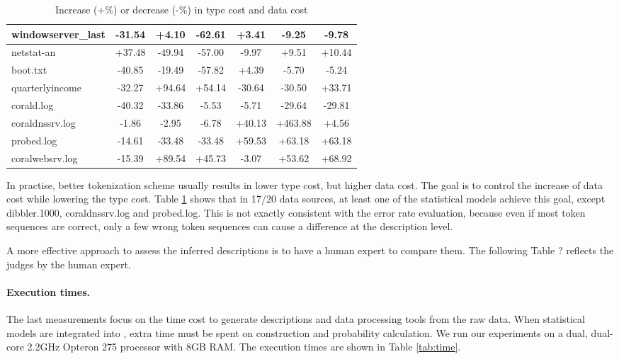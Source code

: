 \begin{table}
\begin{center}
\begin{tabular}{|l||c|c|c||c|c|c|}
windowserver\_last & -31.54 & +4.10 & -62.61 & +3.41 & -9.25 & -9.78  \\ \hline
netstat-an & +37.48 & -49.94 & -57.00 & -9.97 & +9.51 & +10.44 \\ \hline
boot.txt & -40.85 & -19.49 & -57.82 & +4.39 & -5.70 & -5.24 \\ \hline
quarterlyincome & -32.27 & +94.64 & +54.14 & -30.64 & -30.50 & +33.71    \\ \hline
corald.log & -40.32 & -33.86 & -5.53 & -5.71 & -29.64 & -29.81   \\ \hline
coraldnssrv.log  & -1.86 & -2.95 & -6.78 & +40.13 & +463.88 & +4.56 \\ \hline
probed.log & -14.61 & -33.48 & -33.48 & +59.53 & +63.18 & +63.18 \\ \hline
coralwebsrv.log & -15.39 & +89.54 & +45.73 & -3.07 & +53.62 & +68.92   \\
               \hline
\end{tabular}
\caption{Increase (+\%) or decrease (-\%) in type cost and data cost}
\label{tab:complexity}
\end{center}
\end{table}

In practise, better tokenization scheme usually results in lower
type cost, but higher data cost. The goal is to control the increase
of data cost while lowering the type cost. Table \ref{tab:complexity}
shows that in 17/20 data sources, at least one of the statistical
models achieve this goal, except dibbler.1000, coraldnssrv.log and
probed.log. This is not exactly consistent with the error rate
evaluation, because even if most token sequences are correct, only a
few wrong token sequences can cause a difference at the description
level.

A more effective approach to assess the inferred descriptions is to
have a human expert to compare them. The following Table ? reflects
the judges by the human expert.


\paragraph*{Execution times.}

The last measurements focus on the time cost to generate descriptions
and data processing tools from the raw data. When statistical models
are integrated into \learnpads{}, extra time must be spent on
\seqset{} construction and probability calculation. We run our
experiments on a dual, dual-core 2.2GHz Opteron 275 processor with 8GB
RAM. The execution times are shown in Table \ref{tab:time}.

